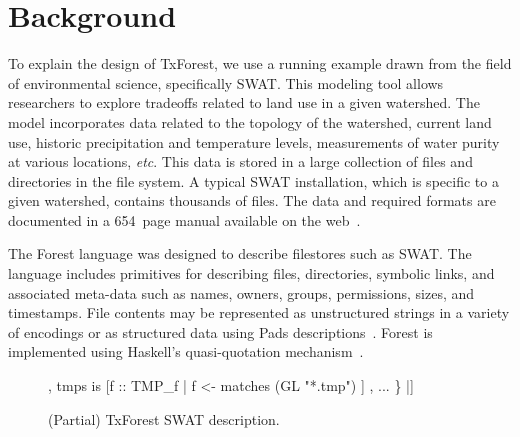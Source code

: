 \section{Background}
\label{sec:Background}


To explain the design of TxForest, we use a running example drawn from
the field of environmental science, specifically SWAT.  This modeling
tool allows researchers to explore tradeoffs related to land use in a
given watershed.  The model incorporates data related to the topology
of the watershed, current land use, historic precipitation and
temperature levels, measurements of water purity at various locations,
\textit{etc}.  This data is stored in a large collection of files and
directories in the file system.  A typical SWAT installation, which is
specific to a given watershed, contains thousands of files.  The data
and required formats are documented in a 654~page manual available on
the web~\cite{SWAT-IO-Documentation}.

The Forest language was designed to describe filestores such as SWAT.
The language includes primitives for describing files, directories,
symbolic links, and associated meta-data such as names, owners,
groups, permissions, sizes, and timestamps.  File contents may be
represented as unstructured strings in a variety of encodings or as
structured data using Pads
descriptions~\cite{fisher+:pads,fisher-walker:icdt}. Forest is
implemented using Haskell's quasi-quotation
mechanism~\cite{Mainland:quasi}.

\begin{figure}
\begin{code}
[txforest|
  \kw{data} Preamble\_f  = File Preamble
  data BSN\_f       = File SwatFile
  data PCP\_f       = File PCP
  data TMP\_f       = File TMP

  data Flow\_f      = File Flow                  
  data RCH\_f       = File RCH                   
  data Deviation\_f = File Deviation     
  ...                                        
  data Swat\_d = Directory 
     \{ cio \kw{is} "file.cio" :: Preamble\_f      
     , basin is <| getBasinPath cio |> :: BSN\_f          
     , pcps  is [f :: PCP\_f | f <- matches (GL "*.pcp") ] 
     , tmps  is [f :: TMP\_f | f <- matches (GL "*.tmp") ] 
     , ...
     \}
|]
\end{code}
\caption{(Partial) TxForest SWAT description. }
\label{fig:SWAT-description}
\end{figure}


